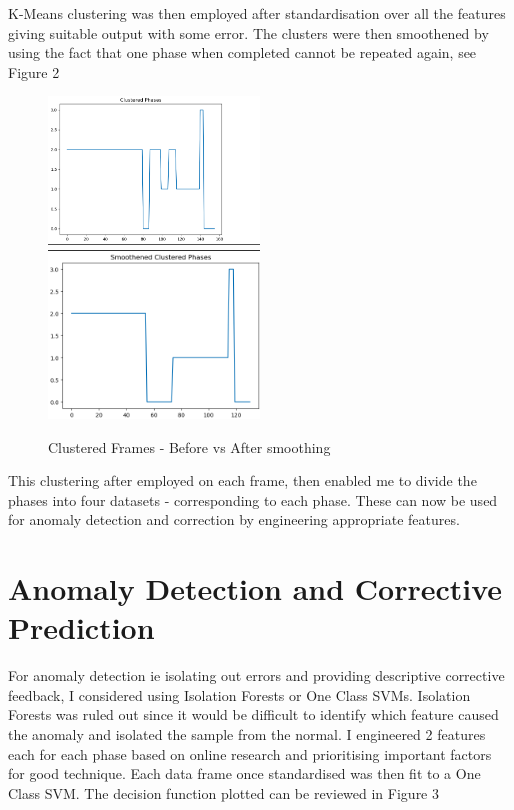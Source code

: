 \documentclass[12pt, letterpaper]{article}
\begin{document}
K-Means clustering was then employed after standardisation over all the features giving suitable output with some error.
The clusters were then smoothened by using the fact that one phase when completed cannot be repeated again, see Figure 2
\begin{figure}[htbp]
    \includegraphics[width=0.5\textwidth]{plots/cluster_graph.png}
    \includegraphics[width=0.5\textwidth]{plots/cluster_smooth.png}
    \caption{Clustered Frames - Before vs After smoothing}
    \label{fig:clustered}
\end{figure}

This clustering after employed on each frame, then enabled me to divide the phases into four datasets - corresponding to each phase.
These can now be used for anomaly detection and correction by engineering appropriate features.

\section{Anomaly Detection and Corrective Prediction}

For anomaly detection ie isolating out errors and providing descriptive corrective feedback, I considered using Isolation Forests or One Class SVMs.
Isolation Forests was ruled out since it would be difficult to identify which feature caused the anomaly and isolated the sample from the normal. I engineered
2 features each for each phase based on online research and prioritising important factors for good technique. Each data frame once standardised was then fit to a One Class SVM.
The decision function plotted can be reviewed in Figure 3
\end{document}
